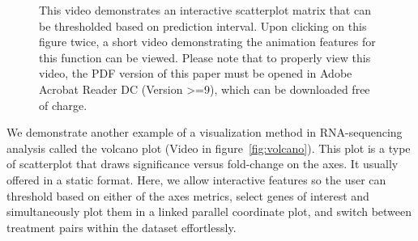 \documentclass[11pt,a4paper,oldfontcommands,openany]{memoir}
\numberwithin{equation}{section} %
\begin{document}
\begin{figure}[H]
    \begin{framed}
    \centering
    \end{framed}
    \caption{This video demonstrates an interactive scatterplot matrix that can be thresholded based on prediction interval. Upon clicking on this figure twice, a short video demonstrating the animation features for this function can be viewed. Please note that to properly view this video, the PDF version of this paper must be opened in Adobe Acrobat Reader DC (Version >=9), which can be downloaded free of charge.}
    \label{fig:scatMatPi}
\end{figure}

We demonstrate another example of a visualization method in RNA-sequencing analysis called the volcano plot (Video in figure~\ref{fig:volcano}). This plot is a type of scatterplot that draws significance versus fold-change on the axes. It usually offered in a static format. Here, we allow interactive features so the user can threshold based on either of the axes metrics, select genes of interest and simultaneously plot them in a linked parallel coordinate plot, and switch between treatment pairs within the dataset effortlessly.
\end{document}
